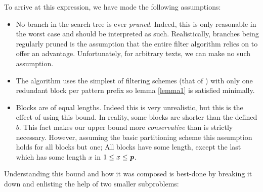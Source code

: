 To arrive at this expression, we have made the following assumptions:

\begin{itemize}
\item No branch in the search tree is ever \textit{pruned}. Indeed, this is only reasonable in the worst case and should be interpreted as such. Realistically, branches being regularly pruned is the assumption that the entire \gls{filter algorithm} relies on to offer an advantage. Unfortunately, for arbitrary \glspl{text}, we can make no such assumption.
\item The algorithm uses the simplest of \glspl{filtering scheme} (that of \kark{}) with only one redundant block per pattern prefix so lemma \ref{lemma1} is satisfied minimally.
\item Blocks are of equal lengths. Indeed this is very unrealistic, but this is the effect of using this bound. In reality, some blocks are shorter than the defined $b$. This fact makes our upper bound more \textit{conservative} than is strictly necessary. However, assuming the basic \vali{} \gls{partitioning scheme} this assumption holds for all blocks but one; All blocks have some  length, except the last which has some length $x$ in $1\leq{}x\leq{}\textit{\textbf{p}}$.
\end{itemize}

Understanding this bound and how it was composed is best-done by breaking it down and enlisting the help of two smaller subproblems:

